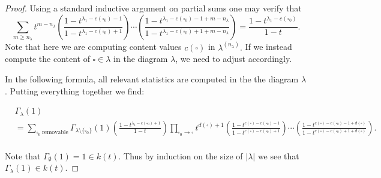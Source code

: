 \documentclass[10pt,a4paper]{amsart}
\begin{document}
\begin{proof}
Using a standard inductive argument on partial sums one may verify that
$$ \sum_{m \geq n_{\lambda}} t^{m-n_{\lambda}} \left(\frac{1-t^{\lambda_1-c(\square_0)-1}}{1-t^{\lambda_1-c(\square_0)+1}}\right)\cdots \left(\frac{1-t^{\lambda_1-c(\square_0)-1+m-n_{\lambda}}}{1-t^{\lambda_1-c(\square_0)+1+m-n_{\lambda}}}\right) = \frac{1-t^{\lambda_1-c(\square_0)}}{1-t}.$$ Note that here we are computing content values $c(\square)$ in $\lambda^{(n_{\lambda})}.$ If we instead compute the content of $\square \in \lambda$ in the diagram $\lambda$, we need to adjust accordingly. 

In the following formula, all relevant statistics are computed in the the diagram $\lambda$. Putting everything together we find:

\begin{align*}
    &\Gamma_{\lambda}(1) \\
    &= \sum_{\square_0~ \text{removable}} \Gamma_{\lambda \setminus \{\square_0\}}(1) \left( \frac{1-t^{\lambda_1-c(\square_0)+1}}{1-t} \right)\prod_{\square_0 \rightarrow \square} t^{d(\square)+1}\left(\frac{1-t^{c(\square)-c(\square_0)-1}}{1-t^{c(\square)-c(\square_0)+1}}\right) \cdots \left(\frac{1-t^{c(\square)-c(\square_0)-1+d(\square)}}{1-t^{c(\square)-c(\square_0)+1+d(\square)}}\right).\\
\end{align*}

Note that $\Gamma_{\emptyset}(1) = 1 \in k(t).$ Thus by induction on the size of $|\lambda|$ we see that $\Gamma_{\lambda}(1) \in k(t).$

\end{proof}
\end{document}
